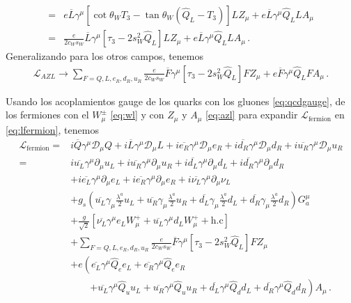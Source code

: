 \begin{frame}
\begin{align}
=&e\overline{L}\gamma^\mu\left[\cot\theta_W T_3-\tan\theta_W\left(\widehat{Q}_L-T_3\right)\right]L Z_\mu
       +e\overline{L}\gamma^\mu \widehat{Q}_L L A_\mu\nonumber\\
=&\frac{e}{2c_W s_W}\overline{L}\gamma^\mu\left[ \tau_3-2s_W^2\widehat{Q}_L\right]L Z_\mu
       +e\overline{L}\gamma^\mu \widehat{Q}_L L A_\mu\,.
\end{align}
Generalizando para los otros campos, tenemos
\begin{align}
  \label{eq:azl}
      \mathcal{L}_{A Z L}\to\sum_{F=Q,L,e_R,d_R,u_R}\frac{e}{2c_W s_W}\overline{F}\gamma^\mu\left[ \tau_3-2s_W^2\widehat{Q}_L\right]F Z_\mu
       +e\overline{F}\gamma^\mu \widehat{Q}_L F A_\mu\,.
\end{align}

Usando los acoplamientos gauge de los quarks con los gluones \eqref{eq:qcdgauge}, de los fermiones con el $W_\mu^\pm$  \eqref{eq:wl} y  con $Z_\mu$ y $A_\mu$ \eqref{eq:azl} para expandir $\mathcal{L}_{\text{fermion}}$ en \eqref{eq:lfermion}, tenemos
\begin{align}
\label{eq:sm1g2}
 \mathcal{L}_{\text{fermion}}=&i\overline{Q}\gamma^\mu\mathcal{D}_\mu Q+i\overline{L}\gamma^\mu\mathcal{D}_\mu L+
i\overline{e_R}\gamma^\mu\mathcal{D}_\mu {e_R}+i\overline{d_R}\gamma^\mu\mathcal{D}_\mu {d_R}+i\overline{u_R}\gamma^\mu\mathcal{D}_\mu {u_R}\nonumber\\
  =&i\overline{u_L}\gamma^\mu\partial_\mu u_L+i\overline{u_R}\gamma^\mu{\partial}_\mu {u_R}+i\overline{d_L}\gamma^\mu\partial_\mu d_L+i\overline{d_R}\gamma^\mu{\partial}_\mu {d_R}\nonumber\\
&+i\overline{e_L}\gamma^\mu{\partial}_\mu e_L
+i\overline{e_R}\gamma^\mu{\partial}_\mu {e_R}+i\overline{\nu_L}\gamma^\mu{\partial}_\mu \nu_L\nonumber\\
&+g_s \left(\overline{u_L}\gamma_\mu\frac{\lambda^a}{2}u_L+\overline{u_R}\gamma_\mu\frac{\lambda^a}{2}u_R
+\overline{d_L}\gamma_\mu\frac{\lambda^a}{2}d_L+ \overline{d_R}\gamma_\mu\frac{\lambda^a}{2}d_R\right)G^\mu_a\nonumber\\
&+\frac{g}{\sqrt{2}}\left[\overline{\nu_L}\gamma^\mu e_LW_\mu^++
\overline{u_L}\gamma^\mu d_LW_\mu^++\text{h.c}\right]\nonumber\\
&+\sum_{F=Q,L,e_R,d_R,u_R}\frac{e}{2c_W s_W}\overline{F}\gamma^\mu\left[ \tau_3-2s_W^2\widehat{Q}_L\right]F Z_\mu\nonumber\\
&+e\left(\overline{e_L}\gamma^\mu \widehat{Q}_e e_L+\overline{e_R}\gamma^\mu \widehat{Q}_e e_R\right.\nonumber\\
  &\qquad\left.+\overline{u_L}\gamma^\mu \widehat{Q}_u u_L+\overline{u_R}\gamma^\mu \widehat{Q}_u u_R
+\overline{d_L}\gamma^\mu \widehat{Q}_d d_L+\overline{d_R}\gamma^\mu \widehat{Q}_d d_R\right) A_\mu\,.
\end{align}


\end{frame}
